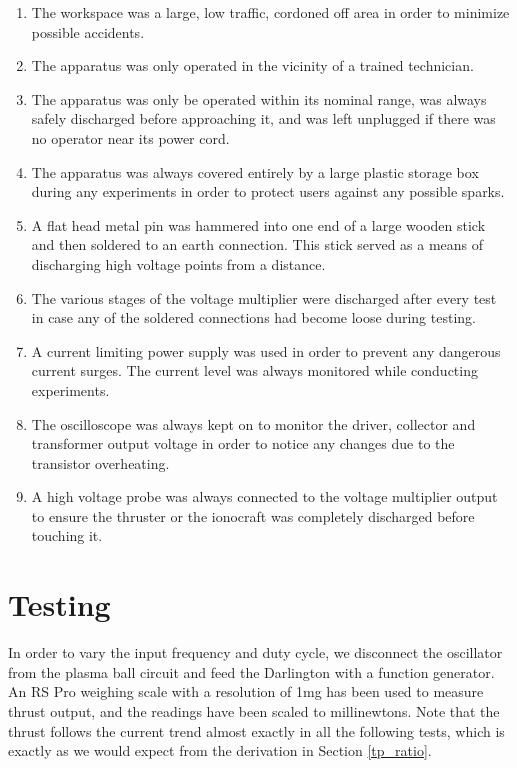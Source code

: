 \documentclass[11pt]{article}
\begin{document}
\begin{enumerate}
\item The workspace was a large, low traffic, cordoned off area in order to minimize possible accidents.
\item The apparatus was only operated in the vicinity of a trained technician.
\item The apparatus was only be operated within its nominal range, was always safely discharged before approaching it, and was left unplugged if there was no operator near its power cord.
\item The apparatus was always covered entirely by a large plastic storage box during any experiments in order to protect users against any possible sparks.
\item A flat head metal pin was hammered into one end of a large wooden stick and then soldered to an earth connection. This stick served as a means of discharging high voltage points from a distance.
\item The various stages of the voltage multiplier were discharged after every test in case any of the soldered connections had become loose during testing.
\item A current limiting power supply was used in order to prevent any dangerous current surges. The current level was always monitored while conducting experiments. 
\item The oscilloscope was always kept on to monitor the driver, collector and transformer output voltage in order to notice any changes due to the transistor overheating.
\item A high voltage probe was always connected to the voltage multiplier output to ensure the thruster or the ionocraft was completely discharged before touching it.
\end{enumerate}
 

\pagebreak
\section{Testing}

In order to vary the input frequency and duty cycle, we disconnect the oscillator from the plasma ball circuit and feed the Darlington with a function generator. An RS Pro weighing scale with a resolution of 1mg has been used to measure thrust output, and the readings have been scaled to millinewtons. Note that the thrust follows the current trend almost exactly in all the following tests, which is exactly as we would expect from the derivation in Section \ref{tp_ratio}.
\end{document}
